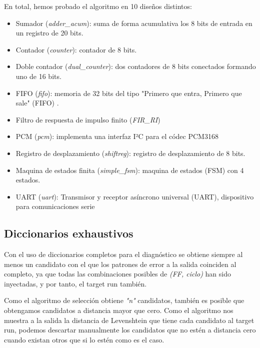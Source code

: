 En total, hemos probado el algoritmo en 10 diseños distintos:
\begin{itemize}
    \item Sumador (\textit{adder\_acum}): suma de forma acumulativa los 8 bits de 
        entrada en un registro de 20 bits.
    \item Contador (\textit{counter}): contador de 8 bits.
    \item Doble contador (\textit{dual\_counter}): dos contadores de 8 bits
        conectados formando uno de 16 bits.
    \item FIFO (\textit{fifo}): memoria de 32 bits del tipo "Primero que entra,
        Primero que sale" (\gls{FIFO}) \cite{FIFO}.
    \item Filtro de respuesta de impulso finito (\textit{FIR\_RI}) \cite{FIR}
    \item PCM (\textit{pcm}): implementa una interfaz I²C para el códec PCM3168
        \cite{PCM}
    \item Registro de desplazamiento (\textit{shiftreg}): registro de
        desplazamiento de 8 bits.
    \item Maquina de estados finita (\textit{simple\_fsm}): maquina de estados
        (\gls{FSM}) con 4 estados.
    \item UART (\textit{uart}): Transmisor y receptor asíncrono universal
        (\gls{UART}), dispositivo para comunicaciones serie \cite{UART}
\end{itemize}

\subsection{Diccionarios exhaustivos}
\label{subsec:LevDicExhaust}
Con el uso de diccionarios completos para el diagnóstico se obtiene siempre al 
menos un candidato con el que los patrones de error a la salida coinciden al
completo, ya que todas las combinaciones posibles de \textit{(\gls{FF}, ciclo)}
han sido inyectadas, y por tanto, el target run también.

Como el algoritmo de selección obtiene \textit{"n"} candidatos, también es posible
que obtengamos candidatos a distancia mayor que cero. Como el algoritmo nos
muestra a la salida la distancia de Levenshtein que tiene cada candidato al target
run, podemos descartar manualmente los candidatos que no estén a distancia cero
cuando existan otros que si lo estén como es el caso.

